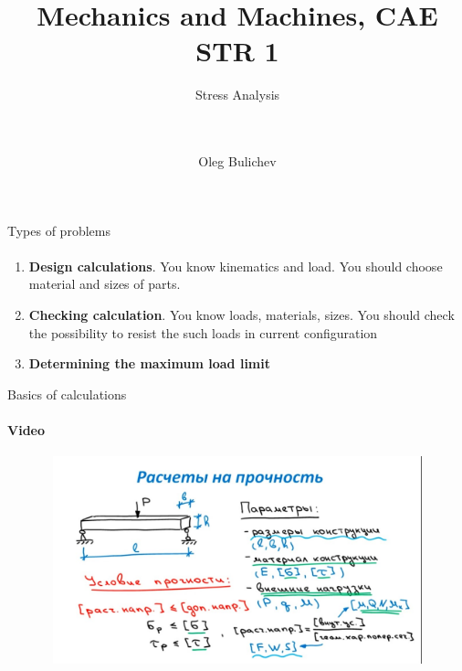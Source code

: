 \documentclass[aspectratio=169]{beamer}
\title[MaM]{Mechanics and Machines, CAE STR 1} %
\subtitle{Stress Analysis
\\ \  \\ \ 
    } %
\author{Oleg Bulichev}
\newcommand{\fbckg}[1]{\usebackgroundtemplate{\texttt{[image: \#1]}}}%
\begin{document}
\setlength{\abovedisplayskip}{0pt}
\setlength{\belowdisplayskip}{0pt}
\setlength{\abovedisplayshortskip}{0pt}
\setlength{\belowdisplayshortskip}{0pt}

\fbckg{fibeamer/figs/title_page.png}

\fbckg{fibeamer/figs/common.png}

\note{\scriptsize
\ 
}

\begin{frame}[t]{Types of problems}
\framesubtitle{}
    \begin{enumerate}
        \item \textbf{Design calculations}. You know kinematics and load. You should choose material and sizes of parts.
        \item \textbf{Checking calculation}. You know loads, materials, sizes. You should check the possibility to resist the such loads in current configuration
        \item \textbf{Determining the maximum load limit} 
    \end{enumerate}
\end{frame}

\begin{frame}[t]{Basics of calculations}
    \framesubtitle{Video}
    \vspace{-0.6cm}
    \begin{figure}[H]
        \href{https://youtu.be/dfUYvLLUpwI}{
            \centering\includegraphics[height=6cm,width=1\textwidth,keepaspectratio]{basics_video.jpg}}
        \label{fig:basics_video.jpg}
    \end{figure}
\end{frame}
\end{document}
